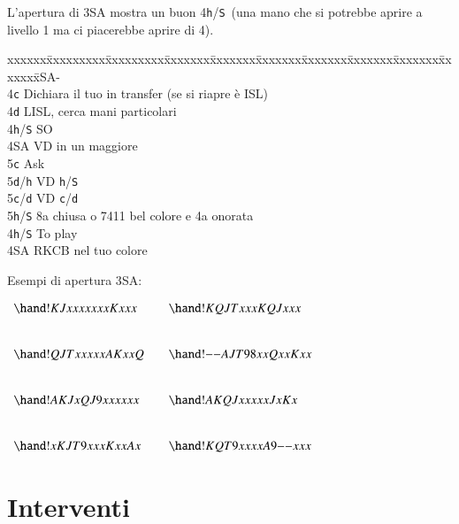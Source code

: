 \documentclass[a4paper,italian]{article}
\newcommand{\BS}{\small{\texttt{S}}}
\newcommand{\BC}{\small{\texttt{c}}}
\newcommand{\BD}{\small{\texttt{d}}}
\newcommand{\BH}{\small{\texttt{h}}}
\newenvironment{bidtable}
{\begin{tabbing}

    xxxxxx\=xxxxxxxxx\=xxxxxxxxx\=xxxxxxx\=xxxxxxx\=xxxxxxx\=xxxxxxx\=xxxxxxx\=xxxxxxx\=xxxxxxx\=\kill}
{\end{tabbing} }%
\newcommand{\void}{--}
\begin{document}
\begin{multicols}{2}
    L'apertura di 3\small{SA} mostra un buon 4\BH/\BS\ (una mano che si potrebbe aprire a livello 1 ma ci piacerebbe aprire di 4).


    \begin{bidtable}
        3\small{SA}-\+\\
        4\BC\> Dichiara il tuo in transfer (se si riapre è ISL)\\
        4\BD\> LISL, cerca mani particolari\+\\
        4\BH/\BS\> SO\\
        4\small{SA}\> VD in un maggiore\+\\
        5\BC\> Ask\+\\
        5\BD/\BH\> VD \BH/\BS\-\-\\
        5\BC/\BD\> VD \BC/\BD\\
        5\BH/\BS\> 8a chiusa o 7411 bel colore e 4a onorata\-\\
        4\BH/\BS\> To play\\
        4\small{SA}\> RKCB nel tuo colore
    \end{bidtable}
    \vfill\null
    \columnbreak

    Esempi di apertura 3\small{SA}:

    \gamefont{\rmfamily\normalsize}
    \otherfont{\rmfamily\normalsize}
    \bidderfont{\rmfamily\normalsize}
    \begin{center}

        $\begin{array}{lcl}
            \hand!{KJxxxxx}{x}{x}{Kxxx} & & \hand!{KQJTxxx}{KQJ}{xx}{x}\\[2.5em]
            \hand!{QJTxxxx}{x}{AKxx}{Q} & & \hand!{\void}{AJT98xx}{Qxx}{Kxx}\\[2.5em]
            \hand!{AKJx}{QJ9xxxx}{x}{x} & & \hand!{AKQJxxx}{xx}{Jx}{Kx}\\[2.5em]
            \hand!{x}{KJT9xxx}{Kxx}{Ax} & & \hand!{KQT9xxxx}{A9}{\void}{xxx}
        \end{array}$
    \end{center}
\end{multicols}

\section{Interventi}
\end{document}
